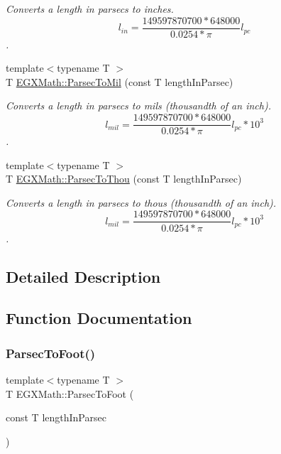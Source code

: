 \begin{DoxyCompactItemize}
\begin{DoxyCompactList}\small\item\em Converts a length in parsecs to inches. \[ l_{in}= \frac{149597870700 * 648000}{0.0254 * \pi} l_{pc} \]. \end{DoxyCompactList}\item 
{\footnotesize template$<$typename T $>$ }\\T \mbox{\hyperlink{group___e_g_x_math-_conversions-_length_conversions-_astronomical-_parsec-_imperial_ga7ff283e88a975e05bd987930e8b3cbf2}{E\+G\+X\+Math\+::\+Parsec\+To\+Mil}} (const T length\+In\+Parsec)
\begin{DoxyCompactList}\small\item\em Converts a length in parsecs to mils (thousandth of an inch). \[ l_{mil}= \frac{149597870700 * 648000}{0.0254 * \pi} l_{pc} * 10^{3} \]. \end{DoxyCompactList}\item 
{\footnotesize template$<$typename T $>$ }\\T \mbox{\hyperlink{group___e_g_x_math-_conversions-_length_conversions-_astronomical-_parsec-_imperial_ga0e473cc0d93ca332b9fc42ed6f8d73c6}{E\+G\+X\+Math\+::\+Parsec\+To\+Thou}} (const T length\+In\+Parsec)
\begin{DoxyCompactList}\small\item\em Converts a length in parsecs to thous (thousandth of an inch). \[ l_{mil}= \frac{149597870700 * 648000}{0.0254 * \pi} l_{pc} * 10^{3} \]. \end{DoxyCompactList}\end{DoxyCompactItemize}


\subsection{Detailed Description}


\subsection{Function Documentation}
\mbox{\label{group___e_g_x_math-_conversions-_length_conversions-_astronomical-_parsec-_imperial_ga2c9e8ada868b6915660db313612ac550}} 
\subsubsection{\texorpdfstring{Parsec\+To\+Foot()}{ParsecToFoot()}}
{\footnotesize\ttfamily template$<$typename T $>$ \\
T E\+G\+X\+Math\+::\+Parsec\+To\+Foot (\begin{DoxyParamCaption}\item[{const T}]{length\+In\+Parsec }\end{DoxyParamCaption})}



